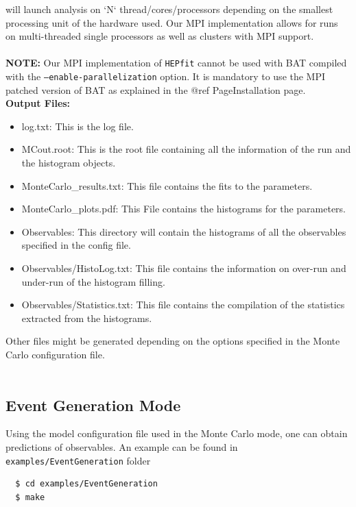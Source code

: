 \documentclass[preprint,3p,12pt]{elsarticle}
\newcommand{\HEPfit}{\texttt{HEPfit}\xspace}
\begin{document}
{will launch analysis on `N` thread/cores/processors depending on the smallest
processing unit of the hardware used. Our MPI implementation allows for runs on multi-threaded single processors as
well as clusters with MPI support.\\\\
%
{\bf NOTE:} Our MPI implementation of \HEPfit cannot be used with
BAT compiled with the \texttt{--enable-parallelization} option. It is
mandatory to use the MPI patched version of BAT as explained in the @ref PageInstallation page.\\


{\bf Output Files:}
\begin{itemize}
\item log.txt: This is the log file.
\item MCout.root: This is the root file containing all the information of the run and
  the histogram objects.
\item MonteCarlo\_results.txt: This file contains the fits to the parameters.
\item MonteCarlo\_plots.pdf: This File contains the histograms for the parameters.
\item Observables: This directory will contain the histograms of all the observables
  specified in the config file.
\item Observables/HistoLog.txt: This file contains the information on over-run and under-run
  of the histogram filling.
\item Observables/Statistics.txt: This file contains the compilation of the statistics
  extracted from the histograms.
\end{itemize}
Other files might be generated depending on the options specified in the Monte Carlo 
configuration file.\\\\
%
\subsection{Event Generation Mode}
\label{sec:MC}
Using the model configuration file used in the Monte Carlo mode, one
can obtain predictions of observables. An example can be found in \texttt{examples/EventGeneration} folder

\begin{lstlisting}
  $ cd examples/EventGeneration
  $ make
\end{lstlisting}

}
\end{document}
